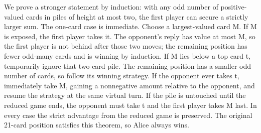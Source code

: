 We prove a stronger statement by induction: with any odd number of positive-valued cards in piles of height at most two, the first player can secure a strictly larger sum. The one-card case is immediate. Choose a largest-valued card M. If M is exposed, the first player takes it. The opponent’s reply has value at most M, so the first player is not behind after those two moves; the remaining position has fewer odd-many cards and is winning by induction. If M lies below a top card t, temporarily ignore that two-card pile. The remaining position has a smaller odd number of cards, so follow its winning strategy. If the opponent ever takes t, immediately take M, gaining a nonnegative amount relative to the opponent, and resume the strategy at the same virtual turn. If the pile is untouched until the reduced game ends, the opponent must take t and the first player takes M last. In every case the strict advantage from the reduced game is preserved. The original 21-card position satisfies this theorem, so Alice always wins.
